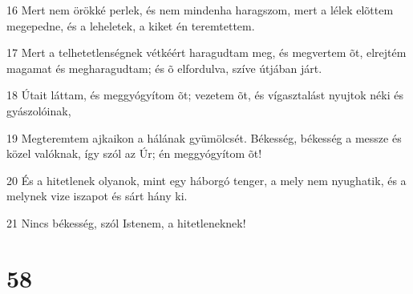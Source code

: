 \par 16 Mert nem örökké perlek, és nem mindenha haragszom, mert a lélek elõttem megepedne, és a leheletek, a kiket én teremtettem.
\par 17 Mert a telhetetlenségnek vétkéért haragudtam meg, és megvertem õt, elrejtém magamat és megharagudtam; és õ elfordulva, szíve útjában járt.
\par 18 Útait láttam, és meggyógyítom õt; vezetem õt, és vígasztalást nyujtok néki és gyászolóinak,
\par 19 Megteremtem ajkaikon a hálának gyümölcsét. Békesség, békesség a messze és közel valóknak, így szól az Úr; én meggyógyítom õt!
\par 20 És a hitetlenek olyanok, mint egy háborgó tenger, a mely nem nyughatik, és a melynek vize iszapot és sárt hány ki.
\par 21 Nincs békesség, szól Istenem, a hitetleneknek!

\chapter{58}

